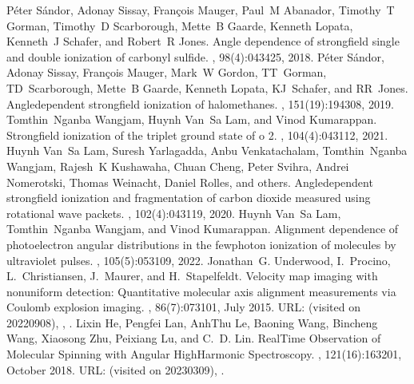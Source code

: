 \documentclass[letterpaper,table,10pt,english]{jupyterBook}
\begin{document}
\begin{sphinxthebibliography}{10}
\sphinxAtStartPar
Péter Sándor, Adonay Sissay, François Mauger, Paul M Abanador, Timothy T Gorman, Timothy D Scarborough, Mette B Gaarde, Kenneth Lopata, Kenneth J Schafer, and Robert R Jones. Angle dependence of strong\sphinxhyphen{}field single and double ionization of carbonyl sulfide. , 98(4):043425, 2018.
\sphinxAtStartPar
Péter Sándor, Adonay Sissay, François Mauger, Mark W Gordon, TT Gorman, TD Scarborough, Mette B Gaarde, Kenneth Lopata, KJ Schafer, and RR Jones. Angle\sphinxhyphen{}dependent strong\sphinxhyphen{}field ionization of halomethanes. , 151(19):194308, 2019.
\sphinxAtStartPar
Tomthin Nganba Wangjam, Huynh Van Sa Lam, and Vinod Kumarappan. Strong\sphinxhyphen{}field ionization of the triplet ground state of o 2. , 104(4):043112, 2021.
\sphinxAtStartPar
Huynh Van Sa Lam, Suresh Yarlagadda, Anbu Venkatachalam, Tomthin Nganba Wangjam, Rajesh K Kushawaha, Chuan Cheng, Peter Svihra, Andrei Nomerotski, Thomas Weinacht, Daniel Rolles, and others. Angle\sphinxhyphen{}dependent strong\sphinxhyphen{}field ionization and fragmentation of carbon dioxide measured using rotational wave packets. , 102(4):043119, 2020.
\sphinxAtStartPar
Huynh Van Sa Lam, Tomthin Nganba Wangjam, and Vinod Kumarappan. Alignment dependence of photoelectron angular distributions in the few\sphinxhyphen{}photon ionization of molecules by ultraviolet pulses. , 105(5):053109, 2022.
\sphinxAtStartPar
Jonathan G. Underwood, I. Procino, L. Christiansen, J. Maurer, and H. Stapelfeldt. Velocity map imaging with non\sphinxhyphen{}uniform detection: Quantitative molecular axis alignment measurements via Coulomb explosion imaging. , 86(7):073101, July 2015. URL:  (visited on 2022\sphinxhyphen{}09\sphinxhyphen{}08), , .
\sphinxAtStartPar
Lixin He, Pengfei Lan, Anh\sphinxhyphen{}Thu Le, Baoning Wang, Bincheng Wang, Xiaosong Zhu, Peixiang Lu, and C. D. Lin. Real\sphinxhyphen{}Time Observation of Molecular Spinning with Angular High\sphinxhyphen{}Harmonic Spectroscopy. , 121(16):163201, October 2018. URL:  (visited on 2023\sphinxhyphen{}03\sphinxhyphen{}09), .

\end{sphinxthebibliography}
\end{document}
